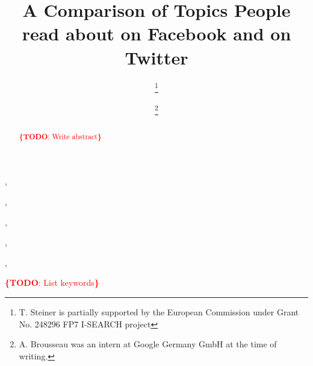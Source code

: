 \documentclass{iosart2c}
\newcommand{\todo}[1]{\noindent\textcolor{red}{{\bf \{TODO}: #1{\bf \}}}}
\begin{document}
\begin{frontmatter}

\title{A Comparison of Topics People read about on Facebook and on Twitter}




\author[A]{ \thanks{T. Steiner is partially supported by the European Commission under Grant No. 248296 FP7 I-SEARCH project}},
\author[B]{ \thanks{A. Brousseau was an intern at Google Germany GmbH at the time of writing.}},
\author[C]{ },
\author[D]{ },
\author[E]{ },
\author[F]{ }


\address[A]{Google Germany GmbH, ABC-Str. 19, 20354 Hamburg, Germany,\\
E-mail: tomac@google.com}
\address[B]{Google Germany GmbH, ABC-Str. 19, 20354 Hamburg, Germany,\\ 
E-mail: arnaud.brousseau@gmail.com}
\address[C]{EURECOM, Sophia Antipolis, France\\
E-mail: raphael.troncy@eurecom.fr}
\address[D]{Ghent University -- IBBT, ELIS, Multimedia Lab, Gaston Crommenlaan 8/201, 9050 Ghent, Belgium,\\
E-mail: ruben.verborgh@ugent.be}
\address[E]{Ghent University -- IBBT, ELIS, Multimedia Lab, Gaston Crommenlaan 8/201, 9050 Ghent, Belgium,\\
E-mail: rik.vandewalle@ugent.be}
\address[F]{Universitat Polit\`{e}cnica de Catalunya, Department LSI, 08034 Barcelona, Spain,\\
E-mail: gabarro@lsi.upc.edu}

\begin{abstract}
\todo{Write abstract}
\end{abstract}

\begin{keyword}
\todo{List keywords}
\end{keyword}

\end{frontmatter}
\end{document}
